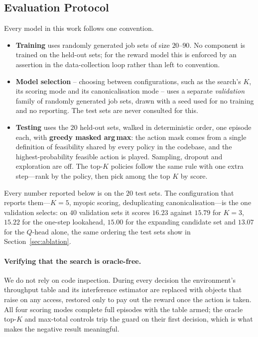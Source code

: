 \documentclass{article}
\begin{document}
\subsection{Evaluation Protocol}
\label{sec:protocol}

Every model in this work follows one convention.

\begin{itemize}\itemsep2pt
\item \textbf{Training} uses randomly generated job sets of size $20$--$90$. No
  component is trained on the held-out sets; for the reward model this is enforced
  by an assertion in the data-collection loop rather than left to convention.
\item \textbf{Model selection} -- choosing between configurations, such as the
  search's $K$, its scoring mode and its canonicalisation mode -- uses a separate
  \emph{validation} family of randomly generated job sets, drawn with a seed used
  for no training and no reporting. The test sets are never consulted for this.
\item \textbf{Testing} uses the $20$ held-out sets, walked in deterministic order,
  one episode each, with \textbf{greedy masked arg\,max}: the action mask comes
  from a single definition of feasibility shared by every policy in the codebase,
  and the highest-probability feasible action is played. Sampling, dropout and
  exploration are off. The top-$K$ policies follow the same rule with one extra
  step---rank by the policy, then pick among the top $K$ by score.
\end{itemize}

\noindent Every number reported below is on the $20$ test sets. The configuration
that reports them---$K{=}5$, myopic scoring, deduplicating canonicalisation---is
the one validation selects: on $40$ validation sets it scores $16.23$ against
$15.79$ for $K{=}3$, $15.22$ for the one-step lookahead, $15.00$ for the expanding
candidate set and $13.07$ for the $Q$-head alone, the same ordering the test sets
show in Section~\ref{sec:ablation}.

\paragraph{Verifying that the search is oracle-free.}
We do not rely on code inspection. During every decision the environment's
throughput table and its interference estimator are replaced with objects that
raise on any access, restored only to pay out the reward once the action is taken.
All four scoring modes complete full episodes with the table armed; the oracle
top-$K$ and max-total controls trip the guard on their first decision, which is
what makes the negative result meaningful.
\end{document}
